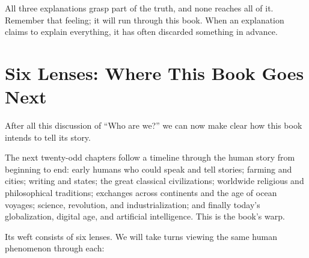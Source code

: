 All three explanations grasp part of the truth, and none reaches all of it. Remember that feeling; it will run through this book. When an explanation claims to explain everything, it has often discarded something in advance.

\section{Six Lenses: Where This Book Goes Next}
After all this discussion of ``Who are we?'' we can now make clear how this book intends to tell its story.

The next twenty-odd chapters follow a timeline through the human story from beginning to end: early humans who could speak and tell stories; farming and cities; writing and states; the great classical civilizations; worldwide religious and philosophical traditions; exchanges across continents and the age of ocean voyages; science, revolution, and industrialization; and finally today's globalization, digital age, and artificial intelligence. This is the book's warp.

Its weft consists of six lenses. We will take turns viewing the same human phenomenon through each:

